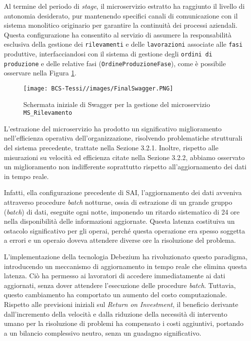        \vspace{0.2 em}
        \noindent Al termine del periodo di \textit{stage}, il microservizio estratto ha raggiunto il livello di autonomia desiderato, pur mantenendo specifici canali di comunicazione con il sistema monolitico originario per garantire la continuità dei processi aziendali. Questa configurazione ha consentito al servizio di assumere la responsabilità esclusiva della gestione dei \texttt{rilevamenti} e delle \texttt{lavorazioni} associate alle \texttt{fasi} produttive, interfacciandosi con il sistema di gestione degli \texttt{ordini di produzione} e delle relative fasi (\texttt{OrdineProduzioneFase}), come è possibile osservare nella Figura \ref{fig:final-Swagger}.
        
        \begin{figure}
            \centering
            \texttt{[image: BCS-Tessi//images/FinalSwagger.PNG]}
            \caption{Schermata iniziale di Swagger per la gestione del microservizio \texttt{MS\_Rilevamento}}
            \label{fig:final-Swagger}
        \end{figure}

        \vspace{0.2 em}
        \noindent L'estrazione del microservizio ha prodotto un significativo miglioramento nell'efficienza operativa dell'organizzazione, risolvendo problematiche strutturali del sistema precedente, trattate nella Sezione 3.2.1. Inoltre, rispetto alle misurazioni su velocità ed efficienza citate nella Sezione 3.2.2, abbiamo osservato un miglioramento non indifferente soprattutto rispetto all'aggiornamento dei dati in tempo reale. 

        \vspace{0.2 em}
        \noindent Infatti, ella configurazione precedente di SAI, l'aggiornamento dei dati avveniva attraverso procedure \textit{batch} notturne, ossia di estrazione di un grande gruppo (\textit{batch}) di dati, eseguite ogni notte, imponendo un ritardo sistematico di 24 ore nella disponibilità delle informazioni aggiornate. Questa latenza costituiva un ostacolo significativo per gli operai, perché questa operazione era spesso soggetta a errori e un operaio doveva attendere diverse ore la risoluzione del problema. 

        \vspace{0.2 em}
        \noindent L'implementazione della tecnologia Debezium ha rivoluzionato questo paradigma, introducendo un meccanismo di aggiornamento in tempo reale che elimina questa latenza. Ciò ha permesso ai lavoratori di accedere immediatamente ai dati aggiornati, senza dover attendere l'esecuzione delle procedure \textit{batch}. Tuttavia, questo cambiamento ha comportato un aumento del costo computazionale. Rispetto alle previsioni iniziali sul \textit{Return on Investment}, il beneficio derivante dall’incremento della velocità e dalla riduzione della necessità di intervento umano per la risoluzione di problemi ha compensato i costi aggiuntivi, portando a un bilancio complessivo neutro, senza un guadagno significativo. 

